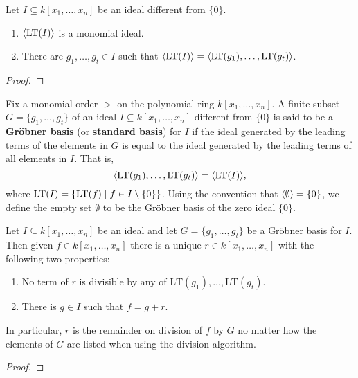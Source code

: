 \begin{theorem} %
    \label{thm:initialIdeal_is_FG}
    \leanok %
    Let $I \subseteq k[x_1, \ldots , x_n]$ be an ideal different from $\{ 0 \}$.
    \begin{enumerate}
        \item $\langle\operatorname{LT}(I)\rangle$ is a monomial ideal.
        \item There are $g_1, \ldots , g_t \in I$ such that $\langle \operatorname{LT}(I)\rangle = \langle \operatorname{LT}(g_1), \ldots , \operatorname{LT}(g_t)\rangle$.
    \end{enumerate}
\end{theorem}
\begin{proof}
  \leanok %
\end{proof}

\begin{definition}\label{def:Groebner_basis}
    \leanok %
    Fix a monomial order $>$ on the polynomial ring $k[x_1, \dots, x_n]$. 
    A finite subset $G = \{g_1, \dots, g_t\}$ of an ideal $I \subseteq k[x_1, \dots, x_n]$ different from $\{0\}$ 
    is said to be a \textbf{Gr{\"o}bner basis} (or \textbf{standard basis}) for $I$ if the ideal generated by the
    leading terms of the elements in $G$ is equal to the ideal generated by the leading terms of all elements in $I$.
    That is,
    \[ \langle \operatorname{LT}(g_1), \dots, \operatorname{LT}(g_t) \rangle = \langle \operatorname{LT}(I) \rangle, \]
    where $\operatorname{LT}(I) = \{\operatorname{LT}(f) \mid f \in I \setminus \{0\}\}$.
    Using the convention that $\langle \emptyset \rangle = \{0\}$, we define the empty set $\emptyset$
    to be the Gr{\"o}bner basis of the zero ideal $\{0\}$.
\end{definition}

\begin{proposition}\label{prop:GR_Unique_Remainder} %
    \leanok %
    Let $I \subseteq k[x_1,\dots,x_n]$ be an ideal and let $G = \{g_1,\dots,g_t\}$ be a Gr{\"o}bner basis for $I$.  
    Then given $f \in k[x_1,\dots,x_n]$ there is a unique $r \in k[x_1,\dots,x_n]$ with the following two properties:
    \begin{enumerate}
    \item No term of $r$ is divisible by any of 
      \(\mathrm{LT}(g_1),\dots,\mathrm{LT}(g_t)\).
    \item There is $g\in I$ such that $f = g + r$.
    \end{enumerate}
    In particular, $r$ is the remainder on division of $f$ by $G$ no matter how the elements of $G$ are listed when using the division algorithm.
\end{proposition}
\begin{proof}
  \leanok %
\end{proof}

